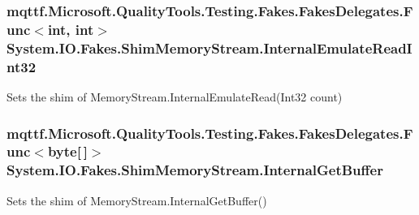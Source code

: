 \hypertarget{class_system_1_1_i_o_1_1_fakes_1_1_shim_memory_stream_acedfddf49e0caa146c4f551b5361e56c}{
\subsubsection[{Internal\-Emulate\-Read\-Int32}]{\setlength{\rightskip}{0pt plus 5cm}mqttf.\-Microsoft.\-Quality\-Tools.\-Testing.\-Fakes.\-Fakes\-Delegates.\-Func$<$int, int$>$ System.\-I\-O.\-Fakes.\-Shim\-Memory\-Stream.\-Internal\-Emulate\-Read\-Int32\hspace{0.3cm}{\ttfamily [set]}}}\label{class_system_1_1_i_o_1_1_fakes_1_1_shim_memory_stream_acedfddf49e0caa146c4f551b5361e56c}


Sets the shim of Memory\-Stream.\-Internal\-Emulate\-Read(\-Int32 count)

\hypertarget{class_system_1_1_i_o_1_1_fakes_1_1_shim_memory_stream_ada2220bca362b0167caba5f03753c635}{
\subsubsection[{Internal\-Get\-Buffer}]{\setlength{\rightskip}{0pt plus 5cm}mqttf.\-Microsoft.\-Quality\-Tools.\-Testing.\-Fakes.\-Fakes\-Delegates.\-Func$<$byte\mbox{[}$\,$\mbox{]}$>$ System.\-I\-O.\-Fakes.\-Shim\-Memory\-Stream.\-Internal\-Get\-Buffer\hspace{0.3cm}{\ttfamily [set]}}}\label{class_system_1_1_i_o_1_1_fakes_1_1_shim_memory_stream_ada2220bca362b0167caba5f03753c635}


Sets the shim of Memory\-Stream.\-Internal\-Get\-Buffer()

